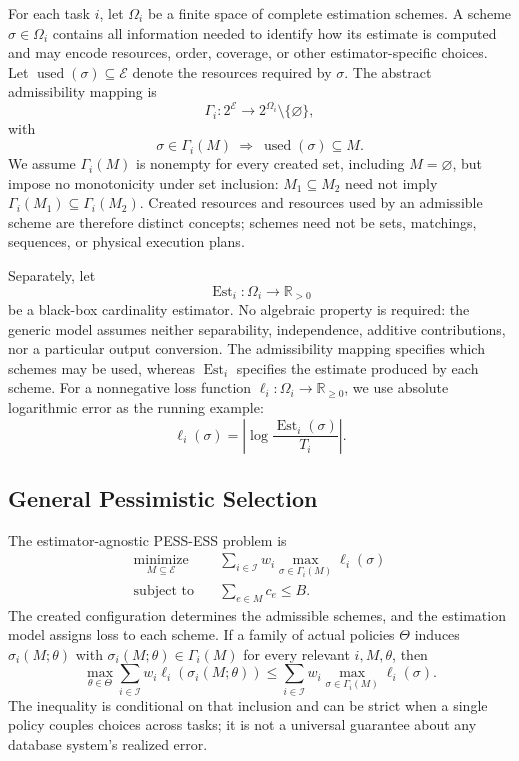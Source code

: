 \documentclass[sigconf, nonacm]{acmart}
\newcommand{\E}{\mathcal{E}}
\begin{document}
For each task \(i\), let \(\Omega_i\) be a finite space of complete
estimation schemes.  A scheme \(\sigma\in\Omega_i\) contains all information
needed to identify how its estimate is computed and may encode resources,
order, coverage, or other estimator-specific choices.  Let
\(\operatorname{used}(\sigma)\subseteq\E\) denote the resources required by
\(\sigma\).  The abstract admissibility mapping is
\[
  \Gamma_i:2^\E\longrightarrow
    2^{\Omega_i}\setminus\{\varnothing\},
\]
with
\[
  \sigma\in\Gamma_i(M)\ \Longrightarrow\
  \operatorname{used}(\sigma)\subseteq M.
\]
We assume \(\Gamma_i(M)\) is nonempty for every created set, including
\(M=\varnothing\), but impose no monotonicity under set inclusion:
\(M_1\subseteq M_2\) need not imply
\(\Gamma_i(M_1)\subseteq\Gamma_i(M_2)\).  Created
resources and resources used by an admissible scheme are therefore
distinct concepts; schemes need not be sets, matchings, sequences, or
physical execution plans.

Separately, let
\[
  \operatorname{Est}_i:\Omega_i\longrightarrow\mathbb{R}_{>0}
\]
be a black-box cardinality estimator.  No algebraic property is required:
the generic model assumes neither separability, independence, additive
contributions, nor a particular output conversion.  The admissibility
mapping specifies which schemes may be used, whereas \(\operatorname{Est}_i\)
specifies the estimate produced by each scheme.  For a nonnegative loss
function \(\ell_i:\Omega_i\to\mathbb{R}_{\geq0}\), we use absolute
logarithmic error as the running example:
\[
  \ell_i(\sigma)=
  \left|\log\frac{\operatorname{Est}_i(\sigma)}{T_i}\right|.
\]

\subsection{General Pessimistic Selection}

The estimator-agnostic PESS-ESS problem is
\[
\boxed{\begin{aligned}
  \operatorname*{minimize}_{M\subseteq\E}\quad
    &\sum_{i\in\mathcal I}w_i
      \max_{\sigma\in\Gamma_i(M)}\ell_i(\sigma)\\
  \text{subject to}\quad
    &\sum_{e\in M}c_e\leq B.
\end{aligned}}
\]
The created configuration determines the admissible schemes, and the
estimation model assigns loss to each scheme.  If a family of actual
policies \(\Theta\) induces \(\sigma_i(M;\theta)\) with
\(\sigma_i(M;\theta)\in\Gamma_i(M)\) for every relevant \(i,M,\theta\), then
\[
  \max_{\theta\in\Theta}\sum_{i\in\mathcal I}w_i
    \ell_i(\sigma_i(M;\theta))
  \leq
  \sum_{i\in\mathcal I}w_i
    \max_{\sigma\in\Gamma_i(M)}\ell_i(\sigma).
\]
The inequality is conditional on that inclusion and can be strict when a
single policy couples choices across tasks; it is not a universal
guarantee about any database system's realized error.
\end{document}
